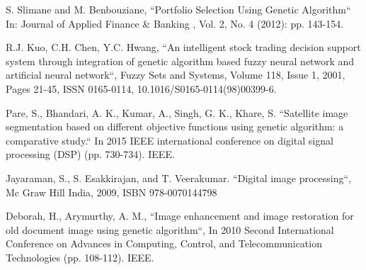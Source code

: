 \documentclass[conference]{IEEEtran}
\begin{document}
\begin{thebibliography}{00}
S. Slimane and M. Benbouziane, ``Portfolio Selection Using Genetic Algorithm`` In: Journal of Applied Finance \& Banking , Vol. 2, No. 4 (2012): pp. 143-154.

R.J. Kuo, C.H. Chen, Y.C. Hwang, ``An intelligent stock trading decision support system through integration of genetic algorithm based fuzzy neural network and artificial neural network``,
Fuzzy Sets and Systems,
Volume 118, Issue 1,
2001,
Pages 21-45,
ISSN 0165-0114,
10.1016/S0165-0114(98)00399-6.

Pare, S., Bhandari, A. K., Kumar, A., Singh, G. K., Khare, S. ``Satellite image segmentation based on different objective functions using genetic algorithm: a comparative study.`` In 2015 IEEE international conference on digital signal processing (DSP) (pp. 730-734). IEEE.

Jayaraman, S., S. Esakkirajan, and T. Veerakumar. ``Digital image processing``, Mc Graw Hill India, 2009, ISBN 978-0070144798

Deborah, H., Arymurthy, A. M., ``Image enhancement and image restoration for old document image using genetic algorithm``, In 2010 Second International Conference on Advances in Computing, Control, and Telecommunication Technologies (pp. 108-112). IEEE.

\end{thebibliography}
\end{document}
